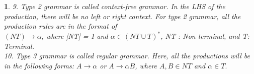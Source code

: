 \documentclass[12pt]{beamer}
\newtheorem{tex}{}
\begin{document}
	\begin{frame}
		
		\begin{tex}
		9. Type 2 grammar is called context-free grammar. In the LHS of the production, there will be no left or right context. For type 2 grammar, all the production rules are in the format of\\ $(NT) \rightarrow \alpha$, where |NT| = 1 and $\alpha \in (NT \cup T)^*$, NT : Non terminal, and T: Terminal.\\
		10. Type 3 grammar is called regular grammar. Here, all the productions will be in the following 
		forms: $A \rightarrow \alpha$ or $A \rightarrow \alpha B$, where $A, B \in NT $ and $\alpha \in T.$  
		\end{tex}
		
		
		
	\end{frame}	
	
	

	

	
	
\end{document}
